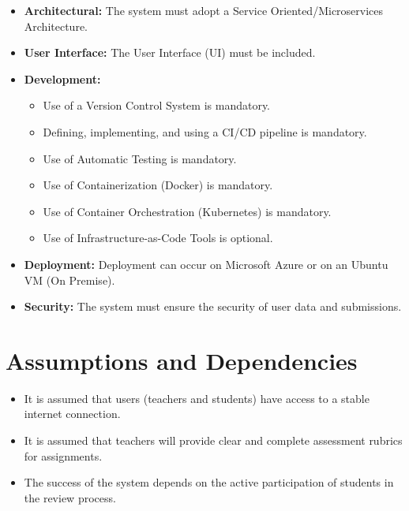 \begin{justify}
    \begin{itemize}
        \item \textbf{Architectural:} The system must adopt a Service Oriented/Microservices Architecture.
        \item \textbf{User Interface:} The User Interface (UI) must be included.
        \item \textbf{Development:}
        \begin{itemize}
            \item Use of a Version Control System is mandatory.
            \item Defining, implementing, and using a CI/CD pipeline is mandatory.
            \item Use of Automatic Testing is mandatory.
            \item Use of Containerization (Docker) is mandatory.
            \item Use of Container Orchestration (Kubernetes) is mandatory.
            \item Use of Infrastructure-as-Code Tools is optional.
        \end{itemize}
        \item \textbf{Deployment:} Deployment can occur on Microsoft Azure or on an Ubuntu VM (On Premise).
        \item \textbf{Security:} The system must ensure the security of user data and submissions.
    \end{itemize}
\end{justify}

\section{Assumptions and Dependencies}

\begin{justify}
    \begin{itemize}
    \item It is assumed that users (teachers and students) have access to a stable internet connection.
    \item It is assumed that teachers will provide clear and complete assessment rubrics for assignments.
    \item The success of the system depends on the active participation of students in the review process.
\end{itemize}
\end{justify}
